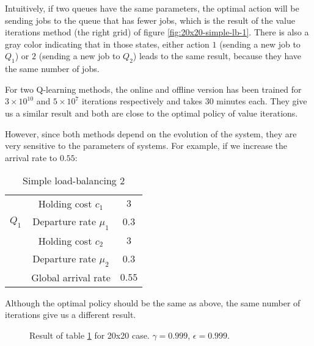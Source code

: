 \documentclass[
  a4paper, xcolor = usenames,dvipsnames]{article}
\theoremstyle{definition}
\theoremstyle{definition}
\theoremstyle{definition}
\theoremstyle{definition}
\theoremstyle{remark}
\begin{document}
Intuitively, if two queues have the same parameters, the optimal action will be sending jobs to the queue that has fewer jobs, which is the result of the value iterations method (the right grid) of figure \ref{fig:20x20-simple-lb-1}. There is also a gray color indicating that in those states, either action \(1\) (sending a new job to \(Q_{1}\)) or \(2\) (sending a new job to \(Q_{2}\)) leads to the same result, because they have the same number of jobs.

For two Q-learning methods, the online and offline version has been trained for \(3 \times 10^{10}\) and \(5 \times 10^{7}\) iterations respectively and takes 30 minutes each. They give us a similar result and both are close to the optimal policy of value iterations.

However, since both methods depend on the evolution of the system, they are very sensitive to the parameters of systems. For example, if we increase the arrival rate to \(0.55\):

\begin{table}[!htbp]
\caption{Simple load-balancing 2}
\begin{center}
\begin{tabular}{c c c}
    \hline
    \multirow{3}{*}{$Q_{1}$} & Holding cost $c_{1}$ & $3$ \\
    & Departure rate $\mu_{1}$ & $0.3$ \\
    \cline{2-3}
    \multirow{3}{*}{$Q_{2}$} & Holding cost $c_{2}$ & $3$ \\
    & Departure rate $\mu_{2}$ & $0.3$ \\
    \cline{2-3}
    & Global arrival rate & $0.55$ \\    
    \hline
\end{tabular}
\end{center}
\label{tab:simple-lb-2}
\end{table}

Although the optimal policy should be the same as above, the same number of iterations give us a different result.



\begin{figure}

{\centering {}

}

\caption{Result of table \ref{tab:simple-lb-2} for 20x20 case. \(\gamma = 0.999\), \(\epsilon = 0.999\).}\label{fig:20x20-simple-lb-2}
\end{figure}
\end{document}
